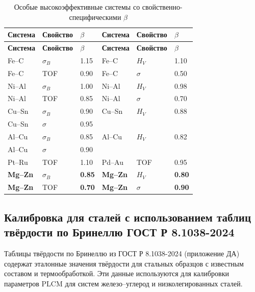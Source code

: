 \documentclass[12pt,a4paper]{article}
\begin{document}
	\begin{longtable}{p{2.2cm} p{2.2cm} p{1.2cm} p{2.2cm} p{2.2cm} p{1.2cm}}
		\caption{Особые высокоэффективные системы со свойственно-специфическими $\beta$}\label{tab:beta_special}\\
		\toprule
		\textbf{Система} & \textbf{Свойство} & $\beta$ & \textbf{Система} & \textbf{Свойство} & $\beta$ \\
		\midrule
		\endfirsthead
		\toprule
		\textbf{Система} & \textbf{Свойство} & $\beta$ & \textbf{Система} & \textbf{Свойство} & $\beta$ \\
		\midrule
		\endhead
		Fe–C  & $\sigma_B$ & 1.15 & Fe–C  & $H_V$ & 1.10 \\
		Fe–C  & TOF & 0.90 & Fe–C  & $\sigma$ & 0.50 \\
		Ni–Al & $\sigma_B$ & 1.00 & Ni–Al & $H_V$ & 0.98 \\
		Ni–Al & TOF & 0.85 & Ni–Al & $\sigma$ & 0.70 \\
		Cu–Sn & $\sigma_B$ & 0.90 & Cu–Sn & $H_V$ & 0.88 \\
		Cu–Sn & $\sigma$ & 0.95 & & & \\
		Al–Cu & $\sigma_B$ & 0.85 & Al–Cu & $H_V$ & 0.82 \\
		Al–Cu & $\sigma$ & 0.90 & & & \\
		Pt–Ru & TOF & 1.10 & Pd–Au & TOF & 0.95 \\
		\rowcolor{gray!10}
		\textbf{Mg–Zn} & $\sigma_B$ & \textbf{0.85} & \textbf{Mg–Zn} & $H_V$ & \textbf{0.80} \\
		\textbf{Mg–Zn} & TOF & \textbf{0.70} & \textbf{Mg–Zn} & $\sigma$ & \textbf{0.90} \\
		\bottomrule
	\end{longtable}
	
	
	\subsection{Калибровка для сталей с использованием таблиц твёрдости по Бринеллю ГОСТ Р 8.1038-2024}
	\label{subsec:steel_calibration}
	
	Таблицы твёрдости по Бринеллю из ГОСТ Р 8.1038-2024 (приложение ДА) содержат эталонные значения твёрдости для стальных образцов с известным составом и термообработкой. Эти данные используются для калибровки параметров PLCM для систем железо–углерод и низколегированных сталей.
	
\end{document}
